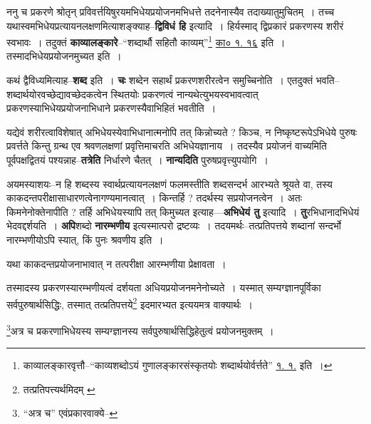 \documentclass[article,12pt,a4paper]{memoir}
\begin{document}
	  \pstart ननु च प्रकरणे श्रोतृन् प्रविवर्त्तयिषुरयमभिधेयप्रयोजनमभिधत्ते तदनेनास्यैव तदाख्यातुमुचितम् । तच्च यथास्वमभिधेयप्रत्यायनलक्षणमित्याशङ्क्याह--\textbf{द्विविधं हि} इत्यादि । हिर्यस्माद् द्विप्रकारं प्रकरणस्य शरीरं स्वभावः । तदुक्तं \textbf{काव्यालङ्कारे}--“शब्दार्थौ सहितौ काव्यम्”\footnote{काव्यालङ्कारवृत्तौ--“काव्यशब्दोऽयं गुणालङ्कारसंस्कृतयोः शब्दार्थयोर्वर्त्तते” \href{http://http://sarit.indology.info/?cref=kāv.1.1}{ १. १.} इति ।} \href{http://http://sarit.indology.info/?cref=kā.1.16}{का० १. १६} इति । तस्मादभिधेयप्रयोजनमुच्यत इति ।
	\pend
      

	  \pstart कथं द्वैविध्यमित्याह--\textbf{शब्द} इति । \textbf{चः} शब्देन सहार्थं प्रकरणशरीरत्वेन समुच्चिनोति । एतदुक्तं भवति--शब्दार्थयोरवच्छेद्यावच्छेदकत्वेन स्थितयोः प्रकरणत्वं नान्यथेत्युभयस्वभावत्वात् प्रकरणस्याभिधेयप्रयोजनाभिधाने प्रकरणस्यैवाभिहितं भवतीति ।
	\pend
      

	  \pstart यद्येवं शरीरत्वाविशेषात् अभिधेयस्येवाभिधानात्मनोपि तत् किन्नोच्यते ? किञ्च, न निष्कृष्टरूपेऽभिधेये पुरुषः प्रवर्त्तते किन्तु ग्रन्थ एव श्रवणलक्षणां प्रवृत्तिमाचरति अभिधेयज्ञानाय । तदस्यैव प्रयोजनं वाच्यमिति पूर्वपक्षद्वितयं पश्यन्नाह--\textbf{तत्रेति} निर्धा\leavevmode{}रणे चैतत् । \textbf{नान्यदिति} पुरुषप्रवृत्त्युपयोगि ।
	\pend
      

	  \pstart अयमस्याशयः--न हि शब्दस्य स्वार्थप्रत्यायनलक्षणं फलमस्तीति शब्दसन्दर्भ आरभ्यते श्रूयते वा, तस्य काकदन्तपरीक्षासाधारणत्वेनागण्यमानत्वात् । किन्तर्हि ? तदर्थस्य सप्रयोजनत्वेन । अतः किमनेनोक्तेनापीति ? तर्हि अभिधेयस्यापि तत् किमुच्यत इत्याह—\textbf{अभिधेयं तु} इत्यादि । \textbf{तु}रभिधानादभिधेयं भेदवद्दर्शयति । \textbf{अपि}शब्दो \textbf{नारम्भणीय} इत्यस्मात्परो द्रष्टव्यः । तदयमर्थः--तत्प्रतिपत्तये शब्दानां सन्दर्भो नारम्भणीयोऽपि स्यात्, किं पुनः श्रवणीय इति ।
	\pend
      \leavevmode{}
	  \bigskip
	  \begingroup
	

	  \pstart यथा काकदन्तप्रयोजनाभावात् न तत्परीक्षा आरम्भणीया प्रेक्षावता ।
	\pend
       

	  \pstart तस्मादस्य प्रकरणस्यारम्भणीयत्वं दर्शयता अधियप्रयोजनमनेनोच्यते । यस्मात् सम्यग्ज्ञानपूर्विका सर्वपुरुषार्थसिद्धिः, तस्मात् तत्प्रतिपत्तये\footnote{तत्प्रतिपत्त्यर्थमिदम् \cite{dp-msA} \cite{dp-edE} \cite{dp-edN} \cite{dp-edH} \cite{dp-edP}} इदमारभ्यत इत्ययमत्र वाक्यार्थः ।
	\pend
       

	  \pstart \footnote{“अत्र च” एवंप्रकारवाक्ये--\cite{dp-msD-n}}अत्र च प्रकरणाभिधेयस्य सम्यग्ज्ञानस्य सर्वपुरुषार्थसिद्धिहेतुत्वं प्रयोजनमुक्तम् ।
	\pend
      
\end{document}
